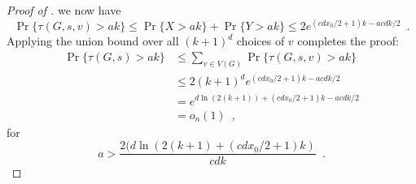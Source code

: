 \documentclass{patmorin}
\begin{document}
{\begin{proof}[Proof of ]
%
 we now have
\[
   \Pr\{ \tau(G,s,v) > ak\} \le \Pr\{X > ak\} + \Pr\{Y>ak\}
          \le 2 e^{(cdx_0/2+1)k - acdk/2} \enspace .
\]
Applying the union bound over all $(k+1)^d$ choices of $v$ completes the proof:
\begin{align*}
   \Pr\{\tau(G,s) > ak\} 
     & \le \sum_{v\in V(G)} \Pr\{\tau(G,s,v) > ak\}  \\
     & \le 2(k+1)^d e^{(cdx_0/2+1)k - acdk/2} \\
     & = e^{d\ln(2(k+1))+(cdx_0/2+1)k - acdk/2} \\
     & = o_n(1) \enspace ,
\end{align*}
for
\[
   a > \frac{2(d\ln(2(k+1)+(cdx_0/2+1)k)}{cdk} \enspace .
\]
\end{proof}

}
\end{document}
